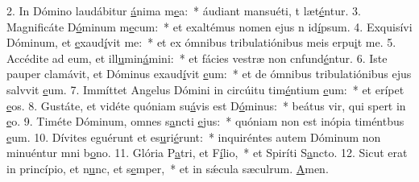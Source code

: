 2. In Dómino laudábitur \uline{á}nima m\uline{e}a:~* áudiant mansuéti, t læt\uline{é}ntur.
3. Magnificáte D\uline{ó}minum m\uline{e}cum:~* et exaltémus nomen ejus n id\uline{í}psum.
4. Exquisívi Dóminum, et \uline{e}xaud\uline{í}vit me:~* et ex ómnibus tribulatiónibus meis erpu\uline{i}t me.
5. Accédite ad eum, et ill\uline{u}min\uline{á}mini:~* et fácies vestræ non cnfund\uline{é}ntur.
6. Iste pauper clamávit, et Dóminus exaud\uline{í}vit \uline{e}um:~* et de ómnibus tribulatiónibus ejus salvvit \uline{e}um.
7. Immíttet Angelus Dómini in circúitu tim\uline{é}ntium \uline{e}um:~* et erípet \uline{e}os.
8. Gustáte, et vidéte quóniam su\uline{á}vis est D\uline{ó}minus:~* beátus vir, qui spert in \uline{e}o.
9. Timéte Dóminum, omnes s\uline{a}ncti \uline{e}jus:~* quóniam non est inópia timéntbus \uline{e}um.
10. Dívites eguérunt et es\uline{u}ri\uline{é}runt:~* inquiréntes autem Dóminum non minuéntur mni b\uline{o}no.
11. Glória P\uline{a}tri, et F\uline{í}lio,~* et Spiríti S\uline{a}ncto.
12. Sicut erat in princípio, et n\uline{u}nc, et s\uline{e}mper,~* et in sǽcula sæculrum. \uline{A}men.
